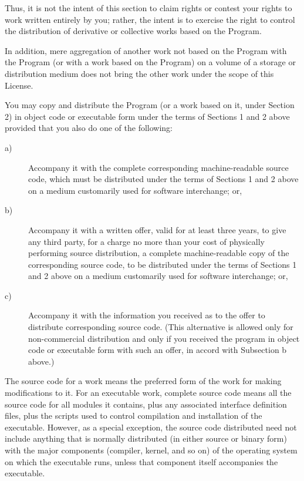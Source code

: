 {\begin{description}
Thus, it is not the intent of this section to claim rights or contest
your rights to work written entirely by you; rather, the intent is to
exercise the right to control the distribution of derivative or
collective works based on the Program.

In addition, mere aggregation of another work not based on the Program
with the Program (or with a work based on the Program) on a volume of a
storage or distribution medium does not bring the other work under the
scope of this License.

\item[3.\hphantom{XX}] You may copy and distribute the Program (or a work based on it,
under Section 2) in object code or executable form under the terms of
Sections 1 and 2 above provided that you also do one of the following:
\begin{description}
\item[a)\ ] Accompany it with the complete corresponding machine-readable
    source code, which must be distributed under the terms of Sections
    1 and 2 above on a medium customarily used for software interchange;
    or,

\item[b)\ ] Accompany it with a written offer, valid for at least three
    years, to give any third party, for a charge no more than your cost
    of physically performing source distribution, a complete
    machine-readable copy of the corresponding source code, to be
    distributed under the terms of Sections 1 and 2 above on a medium
    customarily used for software interchange; or,

\item[c)\ ] Accompany it with the information you received as to the offer
    to distribute corresponding source code.  (This alternative is
    allowed only for non-commercial distribution and only if you
    received the program in object code or executable form with such
    an offer, in accord with Subsection b above.)
\end{description}

The source code for a work means the preferred form of the work for
making modifications to it.  For an executable work, complete source
code means all the source code for all modules it contains, plus any
associated interface definition files, plus the scripts used to control
compilation and installation of the executable.  However, as a special
exception, the source code distributed need not include anything that is
normally distributed (in either source or binary form) with the major
components (compiler, kernel, and so on) of the operating system on
which the executable runs, unless that component itself accompanies the
executable.


\end{description}}
